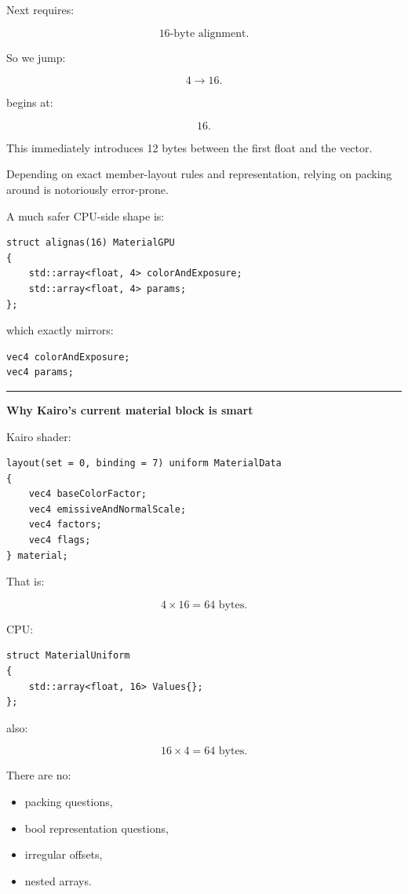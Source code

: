 Next  requires:

\[
16\text{-byte alignment}.
\]

So we jump:

\[
4\rightarrow16.
\]

 begins at:

\[
16.
\]

This immediately introduces 12 bytes between the first float and the vector.

Depending on exact member-layout rules and representation, relying on packing around  is notoriously error-prone.

A much safer CPU-side shape is:

\begin{verbatim}
struct alignas(16) MaterialGPU
{
    std::array<float, 4> colorAndExposure;
    std::array<float, 4> params;
};
\end{verbatim}

which exactly mirrors:

\begin{verbatim}
vec4 colorAndExposure;
vec4 params;
\end{verbatim}

\begin{center}\rule{0.5\linewidth}{0.5pt}\end{center}

\textbf{Why Kairo's current material block is smart}

Kairo shader:

\begin{verbatim}
layout(set = 0, binding = 7) uniform MaterialData
{
    vec4 baseColorFactor;
    vec4 emissiveAndNormalScale;
    vec4 factors;
    vec4 flags;
} material;
\end{verbatim}

That is:

\[
4\times16=64\text{ bytes}.
\]

CPU:

\begin{verbatim}
struct MaterialUniform
{
    std::array<float, 16> Values{};
};
\end{verbatim}

also:

\[
16\times4=64\text{ bytes}.
\]

There are no:

\begin{itemize}
\tightlist
\item
   packing questions,
\item
  bool representation questions,
\item
  irregular offsets,
\item
  nested arrays.
\end{itemize}

